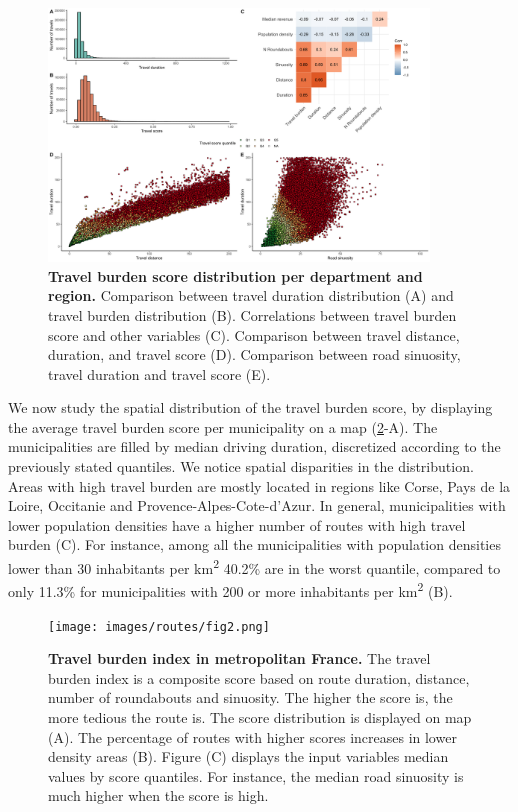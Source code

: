 \begin{figure}[h!]
    \includegraphics[width=0.9\textwidth]{images/routes/sup_fig_3.png}
    \centering
    \caption{
        \textbf{Travel burden score distribution per department and region.}
        Comparison between travel duration distribution (A) and travel burden
        distribution (B). Correlations between travel burden score and other
        variables (C). Comparison between travel distance, duration, and travel
        score (D). Comparison between road sinuosity, travel duration and travel
        score (E).}
    \label{fig:routes-burden-distribution}
\end{figure}

We now study the spatial distribution of the travel burden score, by displaying
the average travel burden score per municipality on a map
(\cref{fig:routes-burden-index}-A). The municipalities are filled by median
driving duration, discretized according to the previously stated quantiles.
We notice spatial disparities in the distribution. Areas with high travel
burden are mostly located in regions like Corse, Pays de la Loire, Occitanie
and Provence-Alpes-Cote-d'Azur. In general, municipalities with lower
population densities have a higher number of routes with high travel burden (C).
For instance, among all the municipalities with population densities lower than
30 inhabitants per km\textsuperscript{2} 40.2\% are in the worst quantile,
compared to only 11.3\% for municipalities with 200 or more inhabitants per
km\textsuperscript{2} (B).

\begin{figure}[h!]
    \texttt{[image: images/routes/fig2.png]}
    \centering
    \caption{
        \textbf{Travel burden index in metropolitan France.}
        The travel burden index is a composite score based on route duration,
        distance, number of roundabouts and sinuosity. The higher the score is,
        the more tedious the route is. The score distribution is displayed on
        map (A). The percentage of routes with higher scores increases in lower
        density areas (B). Figure (C) displays the input variables median values
        by score quantiles. For instance, the median road sinuosity is much
        higher when the score is high. }
    \label{fig:routes-burden-index}
\end{figure}

